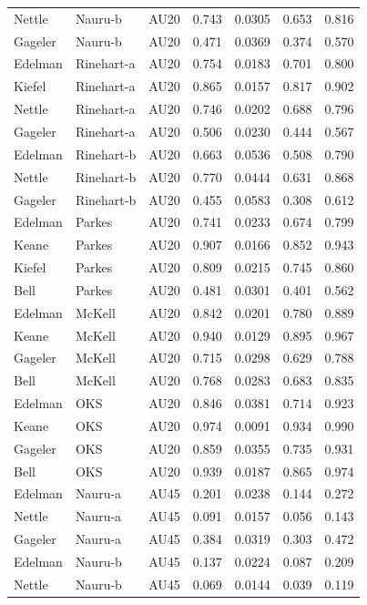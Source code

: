 \documentclass{monashthesis}
\begin{document}
\begin{center}
\begin{longtable}{lllllll}
Nettle & Nauru-b & AU20 & 0.743 & 0.0305 & 0.653 & 0.816 \\
Gageler & Nauru-b & AU20 & 0.471 & 0.0369 & 0.374 & 0.570 \\
Edelman & Rinehart-a & AU20 & 0.754 & 0.0183 & 0.701 & 0.800 \\
Kiefel & Rinehart-a & AU20 & 0.865 & 0.0157 & 0.817 & 0.902 \\
Nettle & Rinehart-a & AU20 & 0.746 & 0.0202 & 0.688 & 0.796 \\
Gageler & Rinehart-a & AU20 & 0.506 & 0.0230 & 0.444 & 0.567 \\
Edelman & Rinehart-b & AU20 & 0.663 & 0.0536 & 0.508 & 0.790 \\
Nettle & Rinehart-b & AU20 & 0.770 & 0.0444 & 0.631 & 0.868 \\
Gageler & Rinehart-b & AU20 & 0.455 & 0.0583 & 0.308 & 0.612 \\
Edelman & Parkes & AU20 & 0.741 & 0.0233 & 0.674 & 0.799 \\
Keane & Parkes & AU20 & 0.907 & 0.0166 & 0.852 & 0.943 \\
Kiefel & Parkes & AU20 & 0.809 & 0.0215 & 0.745 & 0.860 \\
Bell & Parkes & AU20 & 0.481 & 0.0301 & 0.401 & 0.562 \\
Edelman & McKell & AU20 & 0.842 & 0.0201 & 0.780 & 0.889 \\
Keane & McKell & AU20 & 0.940 & 0.0129 & 0.895 & 0.967 \\
Gageler & McKell & AU20 & 0.715 & 0.0298 & 0.629 & 0.788 \\
Bell & McKell & AU20 & 0.768 & 0.0283 & 0.683 & 0.835 \\
Edelman & OKS & AU20 & 0.846 & 0.0381 & 0.714 & 0.923 \\
Keane & OKS & AU20 & 0.974 & 0.0091 & 0.934 & 0.990 \\
Gageler & OKS & AU20 & 0.859 & 0.0355 & 0.735 & 0.931 \\
Bell & OKS & AU20 & 0.939 & 0.0187 & 0.865 & 0.974 \\
Edelman & Nauru-a & AU45 & 0.201 & 0.0238 & 0.144 & 0.272 \\
Nettle & Nauru-a & AU45 & 0.091 & 0.0157 & 0.056 & 0.143 \\
Gageler & Nauru-a & AU45 & 0.384 & 0.0319 & 0.303 & 0.472 \\
Edelman & Nauru-b & AU45 & 0.137 & 0.0224 & 0.087 & 0.209 \\
Nettle & Nauru-b & AU45 & 0.069 & 0.0144 & 0.039 & 0.119 \\

\end{longtable}
\end{center}
\end{document}
